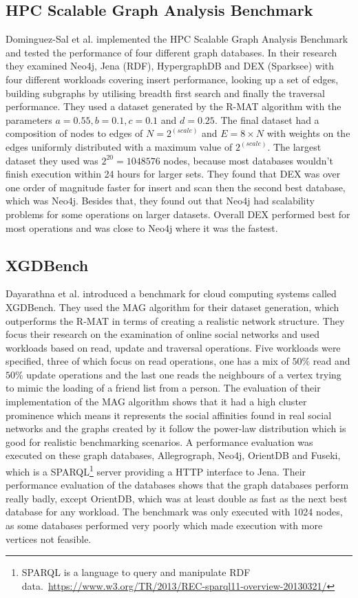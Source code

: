 \subsection{HPC Scalable Graph Analysis Benchmark}
Dominguez-Sal et al. implemented the HPC Scalable Graph Analysis Benchmark and tested the performance of four different graph databases.
In their research they examined Neo4j, Jena (RDF), HypergraphDB and DEX (Sparksee) with four different workloads covering insert performance, looking up a set of edges, building subgraphs by utilising breadth first search and finally the traversal performance.
They used a dataset generated by the R-MAT algorithm with the parameters $ a = 0.55, b = 0.1, c = 0.1 $ and $ d = 0.25 $.
The final dataset had a composition of nodes to edges of $ N = 2^(scale) $ and $ E = 8 \times N $ with weights on the edges uniformly distributed with a maximum value of $ 2^(scale) $.
The largest dataset they used was $ 2^20 = 1048576 $ nodes,
because most databases wouldn't finish execution within 24 hours for larger sets.
They found that DEX was over one order of magnitude faster for insert and scan then the second best database,
which was Neo4j.
Besides that,
they found out that Neo4j had scalability problems for some operations on larger datasets.
Overall DEX performed best for most operations and was close to Neo4j where it was the fastest.~\cite{TaoShen}

\subsection{XGDBench}
Dayarathna et al. introduced a benchmark for cloud computing systems called XGDBench.
They used the MAG algorithm for their dataset generation,
which outperforms the R-MAT in terms of creating a realistic network structure.
They focus their research on the examination of online social networks and used workloads based on read, update and traversal operations.
Five workloads were specified, three of which focus on read operations, one has a mix of $ 50\% $ read and $ 50\% $ update operations and the last one reads the neighbours of a vertex trying to mimic the loading of a friend list from a person.
The evaluation of their implementation of the MAG algorithm shows that it had a high cluster prominence which means it represents the social affinities found in real social networks and the graphs created by it follow the power-law distribution which is good for realistic benchmarking scenarios.
A performance evaluation was executed on these graph databases,
Allegrograph, Neo4j, OrientDB and Fuseki,
which is a SPARQL\footnote{SPARQL is a language to query and manipulate RDF data.~\url{https://www.w3.org/TR/2013/REC-sparql11-overview-20130321/}} server providing a HTTP interface to Jena.
Their performance evaluation of the databases shows that the graph databases perform really badly,
except OrientDB,
which was at least double as fast as the next best database for any workload.
The benchmark was only executed with 1024 nodes,
as some databases performed very poorly which made execution with more vertices not feasible.~\cite{Dayarathna2012}

